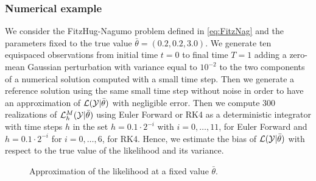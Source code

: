 \subsubsection{Numerical example}

We consider the FitzHug-Nagumo problem defined in \eqref{eq:FitzNag} and the parameters fixed to the true value $\bar\theta = (0.2, 0.2, 3.0)$. We generate ten equispaced observations from initial time $t = 0$ to final time $T = 1$ adding a zero-mean Gaussian perturbation with variance equal to $10^{-2}$ to the two components of a numerical solution computed with a small time step. Then we generate a reference solution using the same small time step without noise in order to have an approximation of $\mathcal{L}(\mathcal{Y}|\bar \theta)$ with negligible error. Then we compute 300 realizations of $\mathcal{L}_h^M(\mathcal{Y}|\bar \theta)$ using Euler Forward or RK4 as a deterministic integrator with time steps $h$ in the set $h = 0.1\cdot 2^{-i}$ with $i = 0, \ldots, 11$, for Euler Forward and $h = 0.1\cdot2^{-i}$ for $i = 0, \ldots, 6$, for RK4. Hence, we estimate the bias of $\mathcal{L}(\mathcal{Y}|\bar \theta)$ with respect to the true value of the likelihood and its variance.

\begin{figure}
	\centering
	\resizebox{0.6\linewidth}{!}{}
	\caption{Approximation of the likelihood at a fixed value $\bar \theta$.}
	\label{fig:MonteCarloVarianceH}
\end{figure}